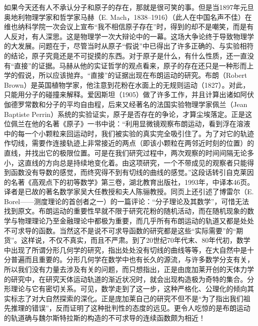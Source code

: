 如果今天还有人不承认分子和原子的存在，那就是很可笑的事。但是当1897年元旦奥地利物理学家和哲学家马赫（E. Mach，1838--1916）（此人在中国名声不佳）在维也纳科学院一次会议上宣布“我不相信原子存在”时，得到的却不是嘲笑，而是有人反对，有人深思。这是物理学一次大辩论中的一幕。这场大争论终于导致物理学的大发展。问题在于，尽管当时从原子“假说”中已得出了许多正确的、与实验相符的结论，原子究竟还是不可捉摸的东西。对于原子是什么，有什么性质，还一直没有“直接”的证据。马赫从他的实证哲学的观点看来，原子的存在还只是一种形而上学的假说，所以应该抛弃。“直接”的证据出现在布朗运动的研究。布朗（Robert Brown）是英国植物学家，他注意到花粉在水面上的无规则运动（1827）。对此，只能用分子的碰撞来解释。爱因斯坦（1905）做了许多工作，并且计算出诸如阿伏伽德罗常数和分子的平均自由程，后来又经著名的法国实验物理学家佩兰（Jean Baptiste Perrin）系统的实验证实，原子是否存在的争论，才算尘埃落定。正是这位佩兰在他的名著《原子》一书中说：“利用显微镜观察布朗运动，看到浮在溶液中的每一个小颗粒来回运动时，我们被实验的真实完全吸引住了。为了对它的轨迹作切线，需要作连接轨迹上非常接近的两点（即该小颗粒在两邻近时刻的位置）的直线，并找出它的极限位置。可是在我们研究过程中，两次观察的时间间隔无论多小，这直线的方向总是持续地变化着。由这项研究，一个不带成见的观察者只能得到函数没有导数的感觉，而终究得不到有切线的曲线的感觉。”这段话转引自克莱因的名著《高观点下的初等数学》第三卷，湖北教育出版社，1993年，中译本46页。译者是已故的著名数学家吴大任教授和夫人陈骊教授。同页上还引述了博雷尔（E. Borel——测度理论的首创者之一）的一篇评论：“分子理论及其数学”，可惜无法找到原文。布朗运动的重要性早就不限于研究花粉的随机活动，而在随机现象的数学与物理理论乃至金融理论中都极为重要，而几乎所有布朗运动的轨道又都是处处不可求导的函数。当然这不是说不可求导函数的研究都是这些“实际需要”的“期货”。这样说，不仅不真实，而且不严肃。到了20世纪70年代末、80年代初，数学中出现了所谓分形几何学的研究，指出处处没有切线的曲线等等，在大自然中是十分普遍而且重要的。分形几何学在数学中也有长久的源流，与许多数学分支有关，所以我们没有力量去涉及有关的问题，而只想指出，正是由庞加莱开创的天体力学的研究中，在研究天体运动轨道的渐近状况时，就会出现构造极为奇特的集合。分形理论与它有密切关系。可见，数学走到了这一步，这种严格化、公理化的倾向其实标志了对大自然探索的深化。正是庞加莱自己的研究不但不是“为了指出我们祖先推理的错误”，反而证明了这种批判性的态度的远见。更令人吃惊的是布朗运动的轨道确与魏尔斯特拉斯的构造的不可求导的连续函数颇为相近！

